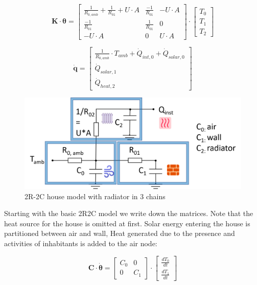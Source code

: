 \begin{equation}
	\mathbf{K} \cdot \boldsymbol{\theta} =
	\begin{bmatrix}
		\frac{1}{R_{0, amb}} + \frac{1}{R_{01}} + U \cdot A & \frac{-1}{R_{01}} & -U \cdot A  \\
		\frac{-1}{R_{01}} &  \frac{1}{R_{01}}  & 0  \\
		-U \cdot A & 0 & U \cdot A 
	\end{bmatrix}
	\cdot
	\begin{bmatrix}
		T_{0} \\
		T_{1} \\
		T_{2}
	\end{bmatrix}
\end{equation}

\begin{equation}
	\mathbf{\dot{q}} =
	\begin{bmatrix}
		\frac{1}{R_{0, amb}} \cdot T_{amb} + \dot{Q}_{int, 0} + \dot{Q}_{solar, 0} \\
		\dot{Q}_{solar, 1} \\
		\dot{Q}_{heat, 2}
	\end{bmatrix}
\end{equation}


\begin{figure}[H]
	\centering
	\includegraphics[width=0.7\columnwidth]{Pictures/2R2C_radiator_chains.png}
	\caption[Short title]{2R-2C house model with radiator in 3 chains}
	\label{fig:2R2Cradiator_chains}
\end{figure} 

Starting with the basic 2R2C model we write down the matrices. Note that the heat source for the house is omitted at first. Solar energy entering the house is partitioned between air and wall, Heat generated due to the presence and activities of inhabitants is added to the air node:

\begin{equation}
	\mathbf{C} \cdot \boldsymbol{\dot{\theta}} =
	\begin{bmatrix}
		C_{0} & 0 \\
		0 &  C_{1}
	\end{bmatrix}
	\cdot
	\begin{bmatrix}
		\frac{dT_{0}}{dt} \\
		\frac{dT_{1}}{dt}
	\end{bmatrix}
\end{equation}

